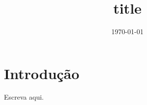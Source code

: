 \documentclass{article}
\title{{{title}}}
\author{}
\date{\today}
\begin{document}
\maketitle

\section{Introdução}

Escreva aqui.
\end{document}
